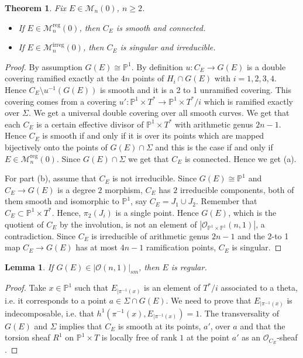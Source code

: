 \documentclass[
  a4paper, 
  reqno, 
  oneside, 
  11pt
]{amsart}
\theoremstyle{plain}	%
\newtheorem{theorem}{Theorem} %
\newtheorem{lemma}{Lemma}
\theoremstyle{mydef} %
\theoremstyle{remark}
\theoremstyle{definition}
\theoremstyle{remark}
\DeclareMathOperator{\reg}{reg}
\DeclareMathOperator{\irreg}{irreg}
\begin{document}
\begin{theorem}\label{aa1}
Fix $E\in \mathcal M_n(0)$, $n\ge 2$. 
\begin{itemize}
\item[(a)] If $E\in \mathcal M_n^{\reg}(0)$, then $C_E$ is smooth and connected.
\item[(b)] If $E\in \mathcal M_n^{\irreg}(0)$, then $C_E$ is singular and irreducible.
\end{itemize}
\end{theorem}

\begin{proof}
By assumption $G(E)\cong \mathbb P^1$. By definition $u: C_E\to G(E)$ is a double covering ramified exactly 
at the $4n$  points of $H_i\cap G(E)$ with $i=1,2,3,4$.
Hence $C_E\setminus u^{-1}(G(E))$ is smooth and it is a 2 to 1 unramified covering. 
This covering comes from a covering
 $u'\colon \mathbb P^1\times T^*\to \mathbb P^1\times T^*/i$ 
 which is ramified exactly over $\Sigma$. We get a universal double covering over all smooth curves. 
 We get that each $C_E$ is a certain effective divisor of $\mathbb P^1\times T^*$ with arithmetic genus $2n-1$. Hence $C_E$ is smooth if and only if it is over its points which are mapped bijectively onto the points of $G(E)\cap \Sigma$ and this is the case if and only if $E\in \mathcal M_n^{\reg}(0)$.
Since $G(E)\cap \Sigma$ we get that $C_E$ is connected. 
Hence we get (a).

For part (b), assume that $C_E$ is not irreducible. Since $G(E)\cong \mathbb{P}^1$ and $C_E\to G(E)$ is a degree $2$ morphism, $C_E$ has $2$ irreducible components, both of them smooth and isomorphic to $\mathbb{P}^1$, say $C_E =J_1\cup J_2$. Remember that $C_E\subset \mathbb{P}^1\times T^*$. Hence, $\pi_2(J_i)$ is a single point.
Hence $G(E)$, which is the quotient of $C_E$ by the involution, is not an element of 
$|\mathcal{O}_{\mathbb{P}^1\times \mathbb{P}^1}(n,1)|$, a contradiction.
Since $C_E$ is irreducible  of arithmetic genus $2n-1$
and the 2-to 1 map $C_E \to G(E)$ has at most $4n-1$ ramification points, $C_E$ is singular.
\end{proof}

\begin{lemma}\label{aa2}
If $G(E)\in |\mathcal O(n,1)|_{sm}$, then $E$ is regular.
\end{lemma}

\begin{proof}
Take $x\in \mathbb P^1$ such that $E_{|\pi^{-1}(x)}$ is an element of $T^*/i$ associated to a theta, i.e. it corresponds to a point $a\in \Sigma\cap G(E)$. We need to prove that $E_{|\pi^{-1}(x)}$ is indecomposable, i.e. that $h^1(\pi^{-1}(x),E_{|\pi^{-1}(x)})=1$. The transversality of $G(E)$ and $\Sigma$ implies that $C_E$ is smooth at its points, $a'$, over $a$ and that the torsion sheaf  $R^1$ on $\mathbb P^1\times T$ is locally free of rank $1$ at the point $a'$ as an $\mathcal O_{C_E}$-sheaf \cite[Remark 2.8]{T}.
\end{proof}
\end{document}
